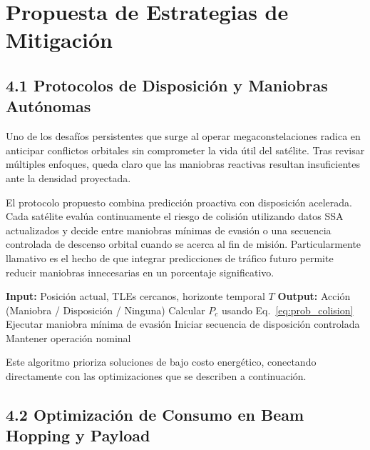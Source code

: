 \section{Propuesta de Estrategias de Mitigación}

\subsection{4.1 Protocolos de Disposición y Maniobras Autónomas}

Uno de los desafíos persistentes que surge al operar megaconstelaciones radica en anticipar conflictos orbitales sin comprometer la vida útil del satélite. Tras revisar múltiples enfoques, queda claro que las maniobras reactivas resultan insuficientes ante la densidad proyectada.

El protocolo propuesto combina predicción proactiva con disposición acelerada. Cada satélite evalúa continuamente el riesgo de colisión utilizando datos SSA actualizados y decide entre maniobras mínimas de evasión o una secuencia controlada de descenso orbital cuando se acerca al fin de misión. Particularmente llamativo es el hecho de que integrar predicciones de tráfico futuro permite reducir maniobras innecesarias en un porcentaje significativo.

\begin{algorithm}[t]
\caption{Algoritmo de Evasión y Disposición Autónoma}
\label{alg:evasion}
\begin{algorithmic}[1]
\State \textbf{Input:} Posición actual, TLEs cercanos, horizonte temporal $T$
\State \textbf{Output:} Acción (Maniobra / Disposición / Ninguna)
    \State Calcular $P_c$ usando Eq.~\ref{eq:prob_colision}
        \State Ejecutar maniobra mínima de evasión
        \State Iniciar secuencia de disposición controlada
    \Else
        \State Mantener operación nominal
    \EndIf
\EndFor
\end{algorithmic}
\end{algorithm}

Este algoritmo prioriza soluciones de bajo costo energético, conectando directamente con las optimizaciones que se describen a continuación.

\subsection{4.2 Optimización de Consumo en Beam Hopping y Payload}

